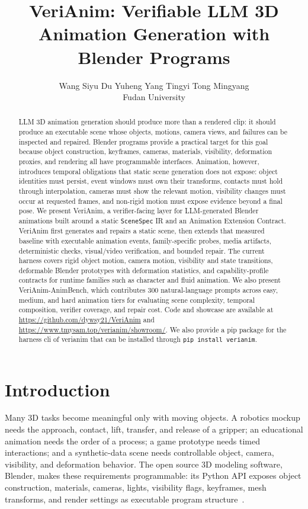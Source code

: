 \documentclass{article}
\title{VeriAnim: Verifiable LLM 3D Animation Generation with Blender Programs}
\author{Wang Siyu \quad Du Yuheng \quad Yang Tingyi \quad Tong Mingyang\\
Fudan University\\
}
\newcommand{\code}[1]{\texttt{#1}}
\begin{document}
\maketitle
\fancyhead{}
\renewcommand{\headrulewidth}{0pt}

\begin{abstract}
LLM 3D animation generation should produce more than a rendered clip: it should produce an executable scene whose objects, motions, camera views, and failures can be inspected and repaired. Blender programs provide a practical target for this goal because object construction, keyframes, cameras, materials, visibility, deformation proxies, and rendering all have programmable interfaces. Animation, however, introduces temporal obligations that static scene generation does not expose: object identities must persist, event windows must own their transforms, contacts must hold through interpolation, cameras must show the relevant motion, visibility changes must occur at requested frames, and non-rigid motion must expose evidence beyond a final pose. We present VeriAnim, a verifier-facing layer for LLM-generated Blender animations built around a static \code{SceneSpec} IR and an Animation Extension Contract. VeriAnim first generates and repairs a static scene, then extends that measured baseline with executable animation events, family-specific probes, media artifacts, deterministic checks, visual/video verification, and bounded repair. The current harness covers rigid object motion, camera motion, visibility and state transitions, deformable Blender prototypes with deformation statistics, and capability-profile contracts for runtime families such as character and fluid animation. We also present VeriAnim-AnimBench, which contributes 300 natural-language prompts across easy, medium, and hard animation tiers for evaluating scene complexity, temporal composition, verifier coverage, and repair cost. Code and showcase are available at \url{https://github.com/dywsy21/VeriAnim} and \url{https://www.tmysam.top/verianim/showroom/}. We also provide a pip package for the harness cli of verianim that can be installed through \code{pip install verianim}.
\end{abstract}

\section{Introduction}

Many 3D tasks become meaningful only with moving objects. A robotics mockup needs the approach, contact, lift, transfer, and release of a gripper; an educational animation needs the order of a process; a game prototype needs timed interactions; and a synthetic-data scene needs controllable object, camera, visibility, and deformation behavior. The open source 3D modeling software, Blender, makes these requirements programmable: its Python API exposes object construction, materials, cameras, lights, visibility flags, keyframes, mesh transforms, and render settings as executable program structure~\citep{blender2026pythonapi}.
\end{document}
